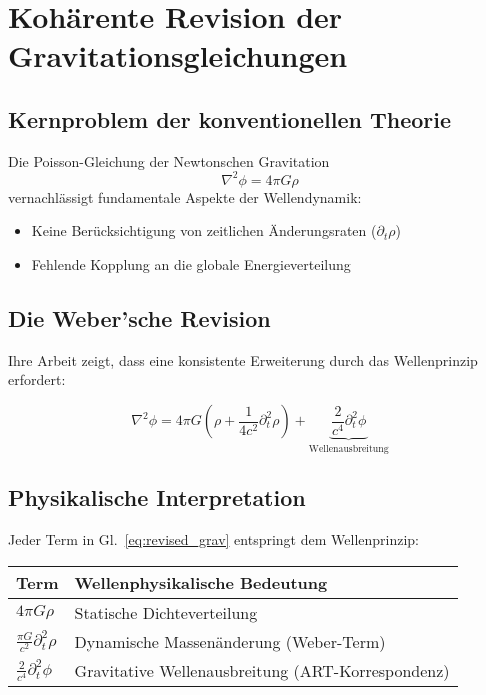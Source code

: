 \section{Kohärente Revision der Gravitationsgleichungen}
\label{sec:gravitationsrevision}

\subsection{Kernproblem der konventionellen Theorie}
Die Poisson-Gleichung der Newtonschen Gravitation 
\begin{equation}
\nabla^2\phi = 4\pi G\rho
\end{equation} 
vernachlässigt fundamentale Aspekte der Wellendynamik:

\begin{itemize}
\item Keine Berücksichtigung von zeitlichen Änderungsraten ($\partial_t\rho$)
\item Fehlende Kopplung an die globale Energieverteilung
\end{itemize}

\subsection{Die Weber'sche Revision}
Ihre Arbeit zeigt, dass eine konsistente Erweiterung durch das Wellenprinzip erfordert:

\begin{equation}
\nabla^2\phi = 4\pi G\left(\rho + \frac{1}{4c^2}\partial_t^2\rho\right) + \underbrace{\frac{2}{c^4}\partial_t^2\phi}_{\text{Wellenausbreitung}}
\label{eq:revised_grav}
\end{equation}

\subsection{Physikalische Interpretation}
Jeder Term in Gl.~\ref{eq:revised_grav} entspringt dem Wellenprinzip:

\begin{table}[h]
\centering
\begin{tabular}{p{}p{}}
\toprule
Term & Wellenphysikalische Bedeutung \\
\midrule
$4\pi G\rho$ & Statische Dichteverteilung \\
$\frac{\pi G}{c^2}\partial_t^2\rho$ & Dynamische Massenänderung (Weber-Term) \\
$\frac{2}{c^4}\partial_t^2\phi$ & Gravitative Wellenausbreitung (ART-Korrespondenz) \\
\bottomrule
\end{tabular}
\end{table}

